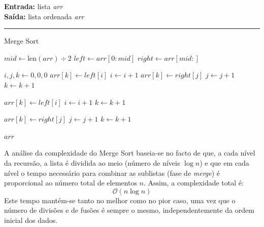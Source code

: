\documentclass[conference]{IEEEtran}
\begin{document}
\begin{algorithm}[h]
    \raggedright
    \vspace{.1em}
    \textbf{Entrada:} lista \textit{arr} \\
    \textbf{Saída:} lista ordenada \textit{arr} \\
    \vspace{.5em}
    \hrule 
    \caption{Merge Sort}
    \begin{algorithmic}[1]
                \State $mid \gets \text{len}(arr) \div 2$
                \State $left \gets arr[0 : mid]$
                \State $right \gets arr[mid : ]$
                
                \State {}
                \State {}
    
                \State $i, j, k \gets 0, 0, 0$
                        \State $arr[k] \gets left[i]$
                        \State $i \gets i + 1$
                    \Else
                        \State $arr[k] \gets right[j]$
                        \State $j \gets j + 1$
                    \EndIf
                    \State $k \gets k + 1$
                \EndWhile
    
                    \State $arr[k] \gets left[i]$
                    \State $i \gets i + 1$
                    \State $k \gets k + 1$
                \EndWhile
    
                    \State $arr[k] \gets right[j]$
                    \State $j \gets j + 1$
                    \State $k \gets k + 1$
                \EndWhile
            \EndIf
        \EndFunction
    
        \State {}
        \State \Return $arr$
    \end{algorithmic}
\end{algorithm}

A análise da complexidade do Merge Sort baseia-se no facto de que, a cada nível da recursão, a lista é dividida ao meio (número de níveis \(\log n\)) e que em cada nível o tempo necessário para combinar as sublistas (fase de \textit{merge}) é proporcional ao número total de elementos \(n\). Assim, a complexidade total é:
\[
\mathcal{O}(n \log n)
\]
Este tempo mantém-se tanto no melhor como no pior caso, uma vez que o número de divisões e de fusões é sempre o mesmo, independentemente da ordem inicial dos dados.
\end{document}
